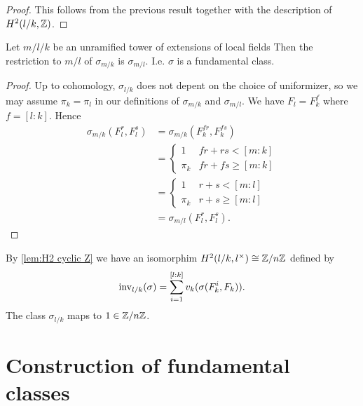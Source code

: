 \begin{proof}
	This follows from the previous result together with
	the description of $H^2(l/k,{\mathbb Z})$.
\end{proof}


\begin{lemma}
	Let $m / l / k$ be an unramified tower of extensions of local fields
	Then the restriction to $m/l$ of $\sigma_{m/k}$ is $\sigma_{m/l}$.
	I.e. $\sigma$ is a fundamental class.
\end{lemma}

\begin{proof}
	Up to cohomology, $\sigma_{l/k}$ does not depent on the choice of
	uniformizer, so we may assume $\pi_k=\pi_l$
	in our definitions of $\sigma_{m/k}$ and $\sigma_{m/l}$.
	We have $F_l = F_k^f$ where $f = [l:k]$.
	Hence
	\begin{align*}
		\sigma_{m/k}(F_l^r, F_l^s)
		&=
		\sigma_{m/k}(F_k^{fr}, F_k^{fs})\\
		&=
		\begin{cases}
			1 & fr + rs < [m:k] \\
			\pi_k & fr + fs \ge [m:k]
		\end{cases}\\
		&=
		\begin{cases}
			1 & r + s < [m:l] \\
			\pi_k & r + s \ge [m:l]
		\end{cases}\\
		&=\sigma_{m/l}(F_l^r,F_l^s).
	\end{align*}
\end{proof}


By \ref{lem:H2 cyclic Z} we have an isomorphim $H^2(l/k, l^\times) \cong {\mathbb Z} / n {\mathbb Z}$ defined by
\[
	\mathrm{inv}_{l/k}(\sigma) = \sum_{i=1}^{[l:k]} v_k(\sigma(F_k^i, F_k)).
\]
The class $\sigma_{l/k}$ maps to $1 \in {\mathbb Z}/n{\mathbb Z}$.







\section{Construction of fundamental classes}

